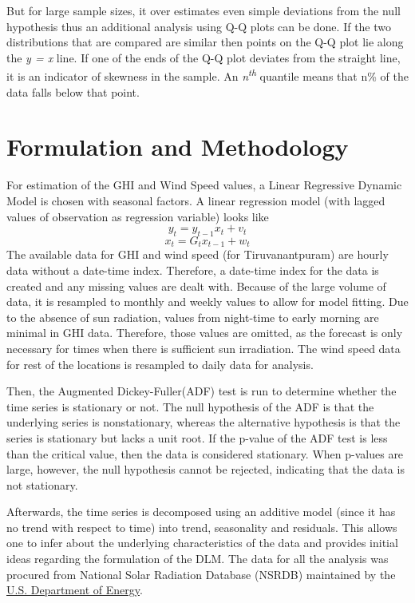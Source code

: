 \documentclass[a4paper,12pt]{article}
\begin{document}
But for large sample sizes, it over estimates even simple deviations from the null hypothesis thus an additional analysis using Q-Q plots can be done. If the two distributions that are compared are similar then points on the Q-Q plot lie along the \emph{y = x} line. If one of the ends of the Q-Q plot deviates from the straight line, it is an indicator of skewness in the sample. An \emph{n\textsuperscript{th}} quantile means that n\% of the data falls below that point.
\pagebreak
\section{Formulation and Methodology}
\label{sec:orgf8ffe0f}
For estimation of the GHI and Wind Speed values, a Linear Regressive Dynamic Model is chosen with seasonal factors. A linear regression model (with lagged values of observation as regression variable) looks like
\[
y_{t} = y_{t-1}x_{t} + v_{t}
\]
\[
x_{t} = G_{t}x_{t-1} + w_{t}
\]
The available data for GHI and wind speed (for Tiruvanantpuram) are hourly data without a date-time index. Therefore, a date-time index for the data is created and any missing values are dealt with. Because of the large volume of data, it is resampled to monthly and weekly values to allow for model fitting. Due to the absence of sun radiation, values from night-time to early morning are minimal in GHI data. Therefore, those values are omitted, as the forecast is only necessary for times when there is sufficient sun irradiation. The wind speed data for rest of the locations is resampled to daily data for analysis.

Then, the Augmented Dickey-Fuller(ADF) test is run to determine whether the time series is stationary or not. The null hypothesis of the ADF is that the underlying series is nonstationary, whereas the alternative hypothesis is that the series is stationary but lacks a unit root. If the p-value of the ADF test is less than the critical value, then the data is considered stationary. When p-values are large, however, the null hypothesis cannot be rejected, indicating that the data is not stationary.

Afterwards, the time series is decomposed using an additive model (since it has no trend with respect to time) into trend, seasonality and residuals. This allows one to infer about the underlying characteristics of the data and provides initial ideas regarding the formulation of the DLM. The data for all the analysis was procured from National Solar Radiation Database (NSRDB) maintained by the \href{https://nsrdb.nrel.gov/}{U.S. Department of Energy}.
\end{document}
